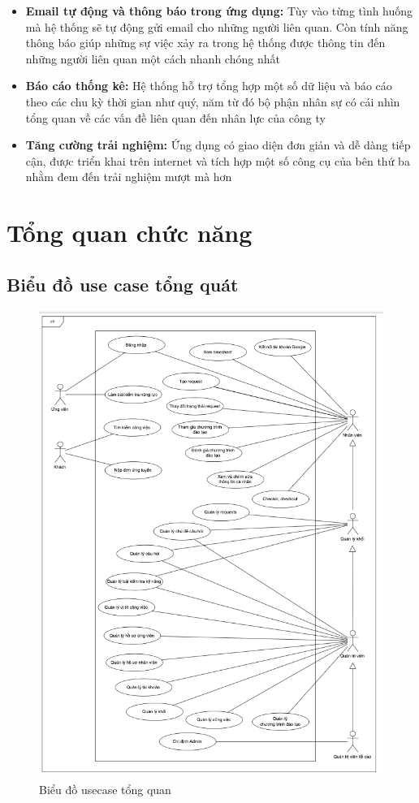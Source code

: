 \documentclass[../DoAn.tex]{subfiles}
\begin{document}
\begin{itemize}
\item \textbf{Email tự động và thông báo trong ứng dụng:} Tùy vào từng tình huống mà hệ thống sẽ tự động gửi email cho những người liên quan. Còn tính năng thông báo giúp những sự việc xảy ra trong hệ thống được thông tin đến những người liên quan một cách nhanh chóng nhất
\item \textbf{Báo cáo thống kê:} Hệ thống hỗ trợ tổng hợp một số dữ liệu và báo cáo theo các chu kỳ thời gian như quý, năm từ đó bộ phận nhân sự có cái nhìn tổng quan về các vấn đề liên quan đến nhân lực của công ty
\item \textbf{Tăng cường trải nghiệm:} Ứng dụng có giao diện đơn giản và dễ dàng tiếp cận, được triển khai trên internet và tích hợp một số công cụ của bên thứ ba nhằm đem đến trải nghiệm mượt mà hơn
\end{itemize}

\section{Tổng quan chức năng}
\label{section:2.2}
\subsection{Biểu đồ use case tổng quát}
\label{section:2.2.1}
\begin{figure}[H]
    \centering
    \includegraphics[width=\linewidth]{Hinhve/UC_TongQuan.png}
    \caption{Biểu đồ usecase tổng quan}
\end{figure}
\end{document}
